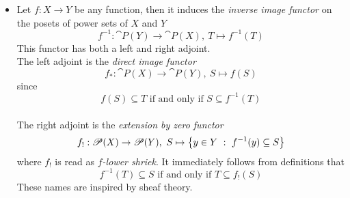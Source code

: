 \begin{example}
\begin{itemize}
\item Let $f:X \to Y$ be any function, then it induces the \emph{inverse image functor} on the posets of power sets of $X$ and $Y$
\[f^{-1}:\cat{P}(Y) \to \cat{P}(X),\ T \mapsto f^{-1}(T)\]
This functor has both a left and right adjoint.\\[1em]
The left adjoint is the \emph{direct image functor}
\[f_*:\cat{P}(X) \to \cat{P}(Y),\ S \mapsto f(S)\]
since 
\[f(S) \subseteq T \text{ if and only if } S \subseteq f^{-1}(T)\]\\
The right adjoint is the \emph{extension by zero functor}
\[f_!:\mathscr{P}(X) \to \mathscr{P}(Y),\ S \mapsto \left\{y \in Y\ :\ f^{-1}(y) \subseteq S\right\}\]
where $f_!$ is read as \emph{$f$-lower shriek}. It immediately follows from definitions that
\[f^{-1}(T) \subseteq S \text{ if and only if } T \subseteq f_!(S)\]
These names are inspired by sheaf theory.
\end{itemize}
\end{example}

\vspace*{0.1in}

